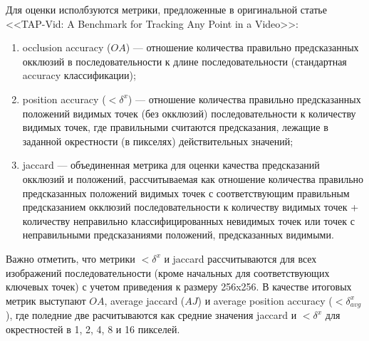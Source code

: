 \documentclass[a4paper, 14pt]{extarticle}
\theoremstyle{definition}
\theoremstyle{plain}
\theoremstyle{remark}
\begin{document}
Для оценки исполбзуются метрики, предложенные в оригинальной статье <<TAP-Vid: A Benchmark for Tracking Any Point in a Video>>: 
\begin{enumerate}
    \item occlusion accuracy ($OA$) --- отношение количества правильно предсказанных окклюзий в последовательности к длине последовательности (стандартная accuracy классификации);
    \item position accuracy ($<\delta^x$) --- отношение количества правильно предсказанных положений видимых точек (без окклюзий) последовательности к количеству видимых точек, где правильными считаются предсказания, лежащие в заданной окрестности (в пикселях) действительных значений;
    \item jaccard --- объединенная метрика для оценки качества предсказаний окклюзий и положений, рассчитываемая как отношение количества правильно предсказанных положений видимых точек с соответствующим правильным предсказанием окклюзий последовательности к количеству видимых точек + количеству неправильно классифицированных невидимых точек или точек с неправильными предсказаниями положений, предсказанных видимыми.
\end{enumerate}
Важно отметить, что метрики $<\delta^x$ и jaccard рассчитываются для всех изображений последовательности (кроме начальных для соответствующих ключевых точек) с учетом приведения к размеру 256x256.
В качестве итоговых метрик выступают $OA$, average jaccard ($AJ$) и average position accuracy ($<\delta^x_{avg}$), где поледние две расчитываются как средние значения jaccard и $<\delta^x$ для окрестностей в 1, 2, 4, 8 и 16 пикселей.
\end{document}
